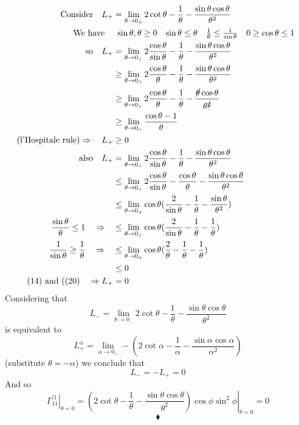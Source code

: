 \begin{align}
\text{Consider}\quad L_{+}& = \lim_{\theta \to 0_{+}}2\cot\theta -\frac{1}{\theta}-\frac{\sin\theta\cos\theta}{\theta^2} \\
\text{We have}\quad &\begin{array}{lllll}
\sin\theta , \theta \ge 0&\sin\theta \leq \theta&\frac{1}{\theta}\leq \frac{1}{\sin \theta}& 0 \ge \cos \theta \leq 1\end{array}\\
\text{so} \quad L_{+}&= \lim_{\theta \to 0_{+}}2\frac{\cos\theta}{\sin\theta} -\frac{1}{\theta}-\frac{\sin\theta\cos\theta}{\theta^2} \\
\ &\geq \lim_{\theta \to 0_{+}}2\frac{\cos\theta}{\theta} -\frac{1}{\theta}-\frac{\sin\theta\cos\theta}{\theta^2} \\
\ &\geq \lim_{\theta \to 0_{+}}2\frac{\cos\theta}{\theta} -\frac{1}{\theta}-\frac{\cancel{\theta}\cos\theta}{\theta^{\cancel{2} }}\\
\ &\geq \lim_{\theta \to 0_{+}}\frac{\cos\theta-1}{\theta}\\
\text{(l'Hospitale rule)}\Rightarrow\quad L_{+}&\geq 0\\
\text{also} \quad L_{+}&= \lim_{\theta \to 0_{+}}2\frac{\cos\theta}{\sin\theta} -\frac{1}{\theta}-\frac{\sin\theta\cos\theta}{\theta^2} \\
\ &\leq \lim_{\theta \to 0_{+}}2\frac{\cos\theta}{\sin\theta} -\frac{\cos\theta}{\theta}-\frac{\sin\theta\cos\theta}{\theta^2} \\
\ &\leq \lim_{\theta \to 0_{+}}\cos\theta(\frac{2}{\sin\theta} -\frac{1}{\theta}-\frac{\sin\theta}{\theta^2})\\
\frac{\sin\theta}{\theta} \leq 1 \quad\Rightarrow\quad &\leq\lim_{\theta \to 0_{+}} \cos\theta(\frac{2}{\sin\theta} -\frac{1}{\theta}-\frac{1}{\theta})\\
\frac{1}{\sin\theta} \geq \frac{1}{\theta} \quad\Rightarrow\quad &\leq\lim_{\theta \to 0_{+}} \cos\theta(\frac{2}{\theta} -\frac{1}{\theta}-\frac{1}{\theta})\\
\ & \leq 0\\
\text{(14) and ((20)}\quad \Rightarrow L_{+}& =0
\end{align} 
Considering that $$L_{-} = \lim_{\theta \to 0_{-}}2\cot\theta -\frac{1}{\theta}-\frac{\sin\theta\cos\theta}{\theta^2}$$ is equivalent to  $$L_{+}^{\alpha} = \lim_{\alpha \to 0_{+}}-(2\cot\alpha -\frac{1}{\alpha}-\frac{\sin\alpha\cos\alpha}{\alpha^2})$$ (substitute $\theta = -\alpha$) we conclude that   $$L_{-} =  -L_{+}=0$$
And so $$\left.\Gamma_{11}^{'1}\right|_{\theta=0} =\left.(2\cot\theta -\frac{1}{\theta}-\frac{\sin\theta\cos\theta}{\theta^2})\cos\phi\sin^2\phi\right|_{\theta=0} = 0$$
$$\blacklozenge$$
\newpage

